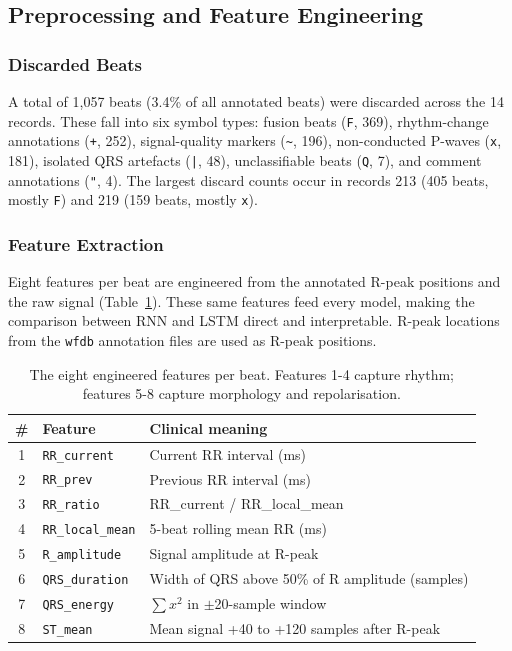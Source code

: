 \documentclass[twocolumn, fontsize=10pt]{article}
\begin{document}
\subsection{Preprocessing and Feature Engineering}
\label{sec:preprocessing}

\subsubsection{Discarded Beats}

A total of 1,057 beats (3.4\% of all annotated beats) were discarded across the 14 records. These fall into six symbol types: fusion beats (\texttt{F}, 369), rhythm-change annotations (\texttt{+}, 252), signal-quality markers (\texttt{\~{}}, 196), non-conducted P-waves (\texttt{x}, 181), isolated QRS artefacts (\texttt{|}, 48), unclassifiable beats (\texttt{Q}, 7), and comment annotations (\texttt{"}, 4). The largest discard counts occur in records 213 (405 beats, mostly \texttt{F}) and 219 (159 beats, mostly \texttt{x}).

\subsubsection{Feature Extraction}

Eight features per beat are engineered from the annotated R-peak positions and the raw signal (Table~\ref{tab:features}). These same features feed every model, making the comparison between RNN and LSTM direct and interpretable. R-peak locations from the \texttt{wfdb} annotation files are used as R-peak positions.

\begin{table}[H]
\centering
\small
\setlength{\tabcolsep}{2pt}
\begin{tabular}{clp{3.2cm}}
\toprule
\textbf{\#} & \textbf{Feature} & \textbf{Clinical meaning} \\
\midrule
1 & \texttt{RR\_current}   & Current RR interval (ms) \\
2 & \texttt{RR\_prev}      & Previous RR interval (ms) \\
3 & \texttt{RR\_ratio}     & RR\_current / RR\_local\_mean \\
4 & \texttt{RR\_local\_mean} & 5-beat rolling mean RR (ms) \\
5 & \texttt{R\_amplitude}  & Signal amplitude at R-peak \\
6 & \texttt{QRS\_duration} & Width of QRS above 50\% of R amplitude (samples) \\
7 & \texttt{QRS\_energy}   & $\sum x^2$ in $\pm$20-sample window \\
8 & \texttt{ST\_mean}      & Mean signal +40 to +120 samples after R-peak \\
\bottomrule
\end{tabular}
\caption{The eight engineered features per beat. Features 1-4 capture rhythm; features 5-8 capture morphology and repolarisation.}
\label{tab:features}
\end{table}
\end{document}
